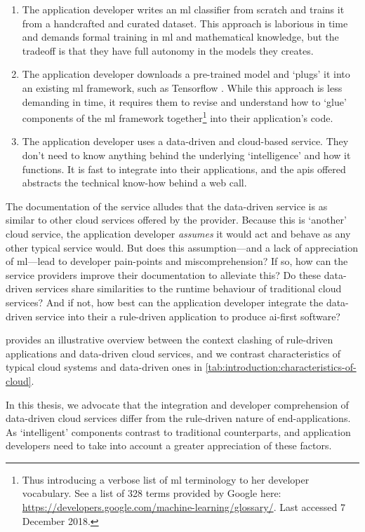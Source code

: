 \begin{enumerate}
  \item The application developer writes an \gls{ml} classifier from scratch and trains it from a handcrafted and curated dataset. This approach is laborious in time and demands formal training in \gls{ml} and mathematical knowledge, but the tradeoff is that they have full autonomy in the models they creates.
  \item The application developer downloads a pre-trained model and `plugs' it into an existing \gls{ml} framework, such as Tensorflow \citep{Abadi:2016vn}. While this approach is less demanding in time, it requires them to revise and understand how to `glue' components of the \gls{ml} framework together\footnote{Thus introducing a verbose list of \gls{ml} terminology to her developer vocabulary. See a list of 328 terms provided by Google here: \url{https://developers.google.com/machine-learning/glossary/}. Last accessed 7 December 2018.} into their application's code.
  \item The application developer uses a data-driven and cloud-based service. They don't need to know anything behind the underlying `intelligence' and how it functions. It is fast to integrate into their applications, and the \glspl{api} offered abstracts the technical know-how behind a web call.
\end{enumerate}

\noindent
The documentation of the service alludes that the data-driven service is as similar to other cloud services offered by the provider. 
Because this is `another' cloud service, the application developer \textit{assumes} it would act and behave as any other typical service would.
But does this assumption---and a lack of appreciation of \gls{ml}---lead to developer pain-points and miscomprehension?
If so, how can the service providers improve their documentation to alleviate this?
Do these data-driven services share similarities to the runtime behaviour of traditional cloud services?
And if not, how best can the application developer integrate the data-driven service into their a rule-driven application to produce \gls{ai}-first software?

 provides an illustrative overview between the context clashing of rule-driven applications and data-driven cloud services, and we contrast characteristics of typical cloud systems and data-driven ones in \cref{tab:introduction:characteristics-of-cloud}.

\begin{callout}
In this thesis, we advocate that the integration and developer comprehension of data-driven cloud services differ from the rule-driven nature of end-applications. As `intelligent' components contrast to traditional counterparts, and application developers need to take into account a greater appreciation of these factors.
\end{callout}

